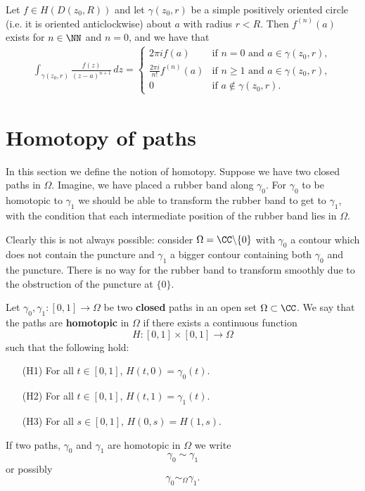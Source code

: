 \documentclass[12pt, a4paper]{article}
\begin{document}
\begin{mdthm}
    Let \(f \in H(D(z_0,R))\) and let \(\gamma(z_0,r)\) be a simple positively oriented circle (i.e. it is oriented anticlockwise) about \(a\) with radius \(r <R\). Then \(f^{(n)}(a)\) exists for \(n \in \NN\) and \(n=0\), and we have that 
    \[\begin{aligned}
        \int_{\gamma(z_0,r)} \frac{f(z)}{(z-a)^{n+1}} \, dz =\begin{cases}
            2\pi i f(a) &\text{if \(n=0\) and \(a \in \gamma(z_0,r)\)}, \\
            \frac{2\pi i}{n!} f^{(n)}(a) &\text{if \(n\geq 1\) and \(a \in \gamma(z_0,r)\)}, \\
            0 &\text{if \(a \not\in \gamma(z_0,r)\)}.
        \end{cases}
    \end{aligned}\]
\end{mdthm}

\section{Homotopy of paths}

In this section we define the notion of homotopy. Suppose we have two closed paths in \(\Omega\). Imagine, we have placed a rubber band along \(\gamma_0\). For \(\gamma_0\) to be homotopic to \(\gamma_1\) we should be able to transform the rubber band to get to \(\gamma_1\), with the condition that each intermediate position of the rubber band lies in \(\Omega\).

\begin{mdremark}
    Clearly this is not always possible: consider \(\Omega = \CC \backslash \{0\}\) with \(\gamma_0\) a contour which does not contain the puncture and \(\gamma_1\) a bigger contour containing both \(\gamma_0\) and the puncture. There is no way for the rubber band to transform smoothly due to the obstruction of the puncture at \(\{0\}\).
\end{mdremark}

\begin{definition}
    Let \(\gamma_0,\gamma_1 : [0,1] \to \Omega\) be two \textbf{closed} paths in an open set \(\Omega \subset \CC\). We say that the paths are \textbf{homotopic} in \(\Omega\) if there exists a continuous function 
    \[H: [0,1] \times [0,1] \to \Omega\] 
    such that the following hold:
    \begin{itemize}
        \item[(H1)] For all \(t \in [0,1]\), \(H(t,0)= \gamma_0(t)\).
        \item[(H2)] For all \(t \in [0,1]\), \(H(t,1) = \gamma_1(t)\).
        \item[(H3)] For all \(s \in [0,1]\), \(H(0,s)=H(1,s)\).
    \end{itemize}
    If two paths, \(\gamma_0\) and \(\gamma_1\) are homotopic in \(\Omega\) we write 
    \[\gamma_0 \sim \gamma_1\]
    or possibly 
    \[\gamma_0 \sim_{\Omega} \gamma_1.\]
\end{definition}
\end{document}
